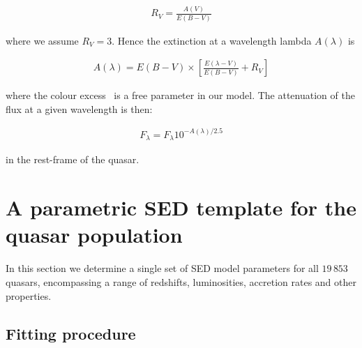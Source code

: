 \begingroup\makeatletter{}\check@mathfonts
\begin{eqnarray}
  R_V = \frac{A(V)}{E(B-V)}
\end{eqnarray}
\endgroup

\noindent where we assume $R_V = 3$.
Hence the extinction at a wavelength lambda $A(\lambda)$ is

\begingroup\makeatletter{}\check@mathfonts
\begin{eqnarray}
  A(\lambda) = E(B-V) \times \left[ \frac{E(\lambda-V)}{E(B-V)} + R_V \right]
\end{eqnarray}
\endgroup

\noindent where the colour excess \ebv\, is a free parameter in our model.
The attenuation of the flux at a given wavelength is then:

\begingroup\makeatletter{}\check@mathfonts
\begin{eqnarray}
  F_\lambda = F_\lambda10^{-A(\lambda)/2.5}
\end{eqnarray}
\endgroup

\noindent in the rest-frame of the quasar.

\section{A parametric SED template for the quasar population}
\label{sec:ch5-standardmodel}

In this section we determine a single set of SED model parameters for all $19\,853$ quasars, encompassing a range of redshifts, luminosities, accretion rates and other properties.

\subsection{Fitting procedure}

